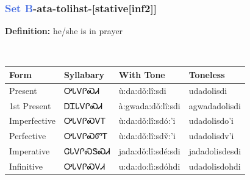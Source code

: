 \subsubsection*{\textcolor{RoyalBlue}{Set B}{-}ata{-}\textbf{tolihst}{-}[stative[inf2]]}
\nopagebreak
\textbf{Definition: } he/she is in prayer
\\[0.5em]
\begin{tabularx}{\textwidth}{l X X X}%
\toprule%
\textbf{Form}&\textbf{Syllabary}&\textbf{With Tone}&\textbf{Toneless}\\%
\midrule%
Present&ᎤᏓᏙᎵᏍᏗ&ù:da:dǒ:lî:sdi&udadolisdi\\%
1st Present&ᎠᏆᏓᏙᎵᏍᏗ&à:gwada:dǒ:lî:sdi&agwadadolisdi\\%
Imperfective&ᎤᏓᏙᎵᏍᏙᎢ&ù:da:dǒ:lî:sdó:’i&udadolisdo’i\\%
Perfective&ᎤᏓᏙᎵᏍᏛᎢ&ù:da:dǒ:lî:sdv̌:’i&udadolisdv’i\\%
Imperative&ᏣᏓᏙᎵᏍᏕᏍᏗ&jada:dǒ:lî:sdé:sdi&jadadolisdesdi\\%
Infinitive&ᎤᏓᏙᎵᏍᏙᏗ&u:da:do:lì:sdóhdi&udadolisdohdi\\%
\bottomrule%
\end{tabularx}
\\[1em]